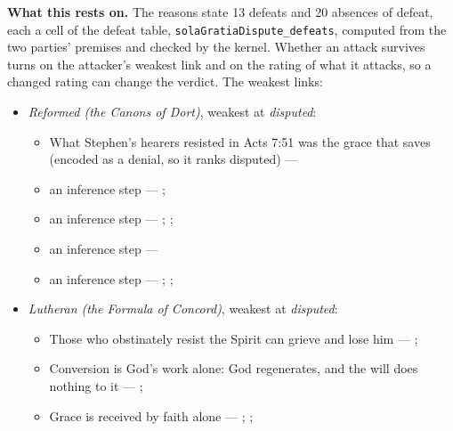 \documentclass[11pt]{article}
\begin{document}
\par\noindent\textbf{What this rests on.} The reasons state 13 defeats and 20 absences of defeat, each a cell of the defeat table, \texttt{sola\allowbreak{}Gratia\allowbreak{}Dispute\_\allowbreak{}defeats}, computed from the two parties' premises and checked by the kernel. Whether an attack survives turns on the attacker's weakest link and on the rating of what it attacks, so a changed rating can change the verdict. The weakest links:
\begin{itemize}
\item \emph{Reformed (the Canons of Dort)}, weakest at \emph{disputed}:
\begin{itemize}
\item What Stephen’s hearers resisted in Acts 7:51 was the grace that saves (encoded as a denial, so it ranks disputed) --- \cite[Canons of Dort, III/IV, art. 9]{schaff-creeds-christendom-3-1977}
\item an inference step --- \cite[ad loc. Eph 2:8]{robertson-word-pictures-4-1931}; \cite[228--229]{calvin-galatians-ephesians-1854}
\item an inference step --- \cite[600]{arminius-works-1-1825}; \cite[681]{arminius-works-1-1825}; \cite[Five Arminian Articles (1610), art. 4]{schaff-creeds-christendom-3-1977}
\item an inference step --- \cite[527--565]{arminius-works-3-1853}
\item an inference step --- \cite[Solid Declaration II.89]{concordia-triglotta-1921}; \cite[Solid Declaration II.60]{concordia-triglotta-1921}; \cite[Solid Declaration XI.41]{concordia-triglotta-1921}
\end{itemize}
\item \emph{Lutheran (the Formula of Concord)}, weakest at \emph{disputed}:
\begin{itemize}
\item Those who obstinately resist the Spirit can grieve and lose him --- \cite[Solid Declaration II.83]{concordia-triglotta-1921}; \cite[Solid Declaration XI.42]{concordia-triglotta-1921}
\item Conversion is God’s work alone: God regenerates, and the will does nothing to it --- \cite[Solid Declaration II.89]{concordia-triglotta-1921}; \cite[Solid Declaration II.90]{concordia-triglotta-1921}
\item Grace is received by faith alone --- \cite[Augsburg Confession IV.1–3]{concordia-triglotta-1921}; \cite[Sermon 1, III.1]{wesley-sermons-1872}; \cite[Trent, Session VI (1547), canon 9]{tanner-decrees-1990}

\end{itemize}
\end{itemize}
\end{document}
